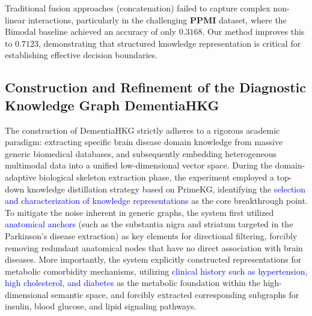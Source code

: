 \documentclass[lettersize,journal]{IEEEtran}
\begin{document}
    Traditional fusion approaches (concatenation) failed to capture complex non-linear interactions, particularly in the challenging \textbf{PPMI} dataset, where the Bimodal baseline achieved an accuracy of only $0.3168$. Our method improves this to $0.7123$, demonstrating that structured knowledge representation is critical for establishing effective decision boundaries.


\subsection{Construction and Refinement of the Diagnostic Knowledge Graph DementiaHKG}

The construction of DementiaHKG strictly adheres to a rigorous academic paradigm: extracting specific brain disease domain knowledge from massive generic biomedical databases, and subsequently embedding heterogeneous multimodal data into a unified low-dimensional vector space. During the domain-adaptive biological skeleton extraction phase, the experiment employed a top-down knowledge distillation strategy based on PrimeKG, identifying the \textcolor{blue}{selection and characterization of knowledge representations} as the core breakthrough point. To mitigate the noise inherent in generic graphs, the system first utilized \textcolor{blue}{anatomical anchors} (such as the substantia nigra and striatum targeted in the Parkinson's disease extraction) as key elements for directional filtering, forcibly removing redundant anatomical nodes that have no direct association with brain diseases. More importantly, the system explicitly constructed representations for metabolic comorbidity mechanisms, utilizing \textcolor{blue}{clinical history such as hypertension, high cholesterol, and diabetes} as the metabolic foundation within the high-dimensional semantic space, and forcibly extracted corresponding subgraphs for insulin, blood glucose, and lipid signaling pathways.
\end{document}
